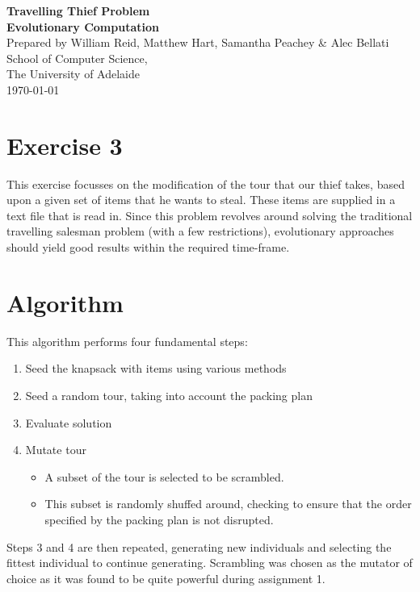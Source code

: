 \documentclass[a4paper, 12pt]{article}
\begin{document}
\begin{center}
{\LARGE\bf Travelling Thief Problem}\\
\vspace{0.5cm}
{\Large\bf Evolutionary Computation}\\
\vspace{1cm}
Prepared by William Reid, Matthew Hart, Samantha Peachey \& Alec Bellati\\
\vspace{1cm}
School of Computer Science,\\
The University of Adelaide\\
\vspace{1cm}
\today
\end{center}

\section*{Exercise 3}
This exercise focusses on the modification of the tour that our thief takes, based upon a given set of items that he wants to steal. These items are supplied in a text file that is read in. Since this problem revolves around solving the traditional travelling salesman problem (with a few restrictions), evolutionary approaches should yield good results within the required time-frame. 

\section{Algorithm}
This algorithm performs four fundamental steps:

\begin{enumerate}
\item Seed the knapsack with items using various methods
\item Seed a random tour, taking into account the packing plan
\item Evaluate solution
\item Mutate tour
	\begin{itemize}
		\item A subset of the tour is selected to be scrambled. 
		\item This subset is randomly shuffed around, checking to ensure that the order specified by the packing plan is not disrupted. 
	\end{itemize}

\end{enumerate}
Steps 3 and 4 are then repeated, generating new individuals and selecting the fittest individual to continue generating. Scrambling was chosen as the mutator of choice as it was found to be quite powerful during assignment 1. 
\end{document}
